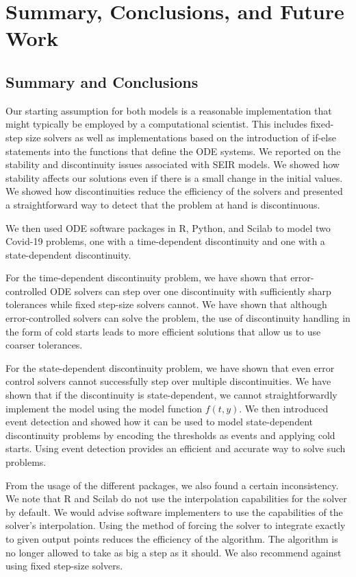 
\section{Summary, Conclusions, and Future Work}
\label{section:summary}
\subsection{Summary and Conclusions}
Our starting assumption for both models is a reasonable implementation that might typically be employed by a computational scientist. This includes fixed-step size solvers as well as implementations based on the introduction of if-else statements into the functions that define the ODE systems. 
We reported on the stability and discontinuity issues associated with SEIR models. We showed how stability affects our solutions even if there is a small change in the initial values. We showed how discontinuities reduce the efficiency of the solvers and presented a straightforward way to detect that the problem at hand is discontinuous.

We then used ODE software packages in R, Python, and Scilab to model two Covid-19 problems, one with a time-dependent discontinuity and one with a state-dependent discontinuity.

For the time-dependent discontinuity problem, we have shown that error-controlled ODE solvers can step over one discontinuity with sufficiently sharp tolerances while fixed step-size solvers cannot. We have shown that although error-controlled solvers can solve the problem, the use of discontinuity handling in the form of cold starts leads to more efficient solutions that allow us to use coarser tolerances. 

For the state-dependent discontinuity problem, we have shown that even error control solvers cannot successfully step over multiple discontinuities. We have shown that if the discontinuity is state-dependent, we cannot straightforwardly implement the model using the model function $f(t, y)$. We then introduced event detection and showed how it can be used to model state-dependent discontinuity problems by encoding the thresholds as events and applying cold starts. Using event detection provides an efficient and accurate way to solve such problems.

From the usage of the different packages, we also found a certain inconsistency. We note that R and Scilab do not use the interpolation capabilities for the solver by default. We would advise software implementers to use the capabilities of the solver's interpolation. Using the method of forcing the solver to integrate exactly to given output points reduces the efficiency of the algorithm. The algorithm is no longer allowed to take as big a step as it should.
We also recommend against using fixed step-size solvers.

